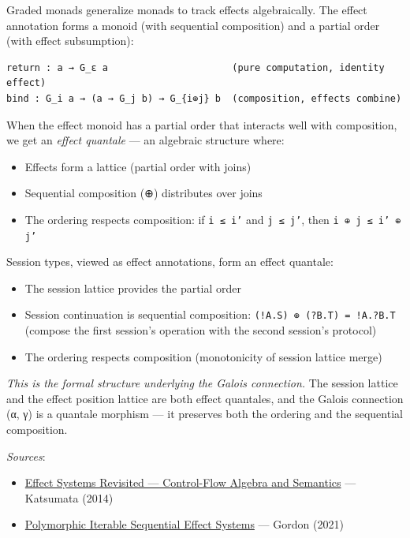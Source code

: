 \documentclass[11pt]{article}
\begin{document}
Graded monads generalize monads to track effects algebraically. The effect
annotation forms a monoid (with sequential composition) and a partial order
(with effect subsumption):

\begin{verbatim}
return : a → G_ε a                      (pure computation, identity effect)
bind : G_i a → (a → G_j b) → G_{i⊕j} b  (composition, effects combine)
\end{verbatim}

When the effect monoid has a partial order that interacts well with composition,
we get an \emph{effect quantale} — an algebraic structure where:
\begin{itemize}
\item Effects form a lattice (partial order with joins)
\item Sequential composition (⊕) distributes over joins
\item The ordering respects composition: if \texttt{i ≤ i'} and \texttt{j ≤ j'}, then \texttt{i ⊕ j ≤ i' ⊕ j'}
\end{itemize}

Session types, viewed as effect annotations, form an effect quantale:
\begin{itemize}
\item The session lattice provides the partial order
\item Session continuation is sequential composition: \texttt{(!A.S) ⊕ (?B.T) = !A.?B.T}
(compose the first session's operation with the second session's protocol)
\item The ordering respects composition (monotonicity of session lattice merge)
\end{itemize}

\emph{This is the formal structure underlying the Galois connection.} The session
lattice and the effect position lattice are both effect quantales, and the
Galois connection (α, γ) is a quantale morphism — it preserves both the
ordering and the sequential composition.

\emph{Sources}:
\begin{itemize}
\item \href{https://www.cs.kent.ac.uk/people/staff/dao7/publ/effects-revisited.pdf}{Effect Systems Revisited — Control-Flow Algebra and Semantics} — Katsumata (2014)
\item \href{https://dl.acm.org/doi/fullHtml/10.1145/3450272}{Polymorphic Iterable Sequential Effect Systems} — Gordon (2021)
\end{itemize}
\end{document}
